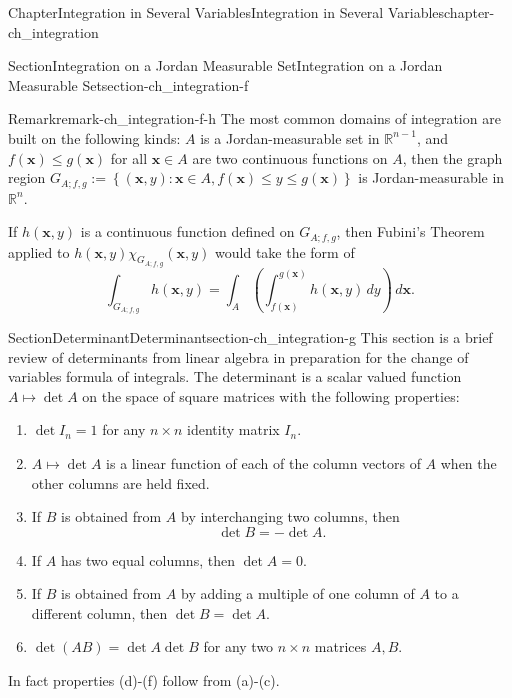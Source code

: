 \documentclass[oneside,10pt,]{book}
\numberwithin{equation}{section}
\newcommand{\bx}{\mathbf{x}}
\begin{document}
\begin{chapterptx}{Chapter}{Integration in Several Variables}{}{Integration in Several Variables}{}{}{chapter-ch_integration}
\begin{sectionptx}{Section}{Integration on a Jordan Measurable Set}{}{Integration on a Jordan Measurable Set}{}{}{section-ch_integration-f}
\begin{remark}{Remark}{}{remark-ch_integration-f-h}
The most common domains of integration are built on the following kinds: \(A\) is a Jordan-measurable set in \(\mathbb R^{n-1}\), and \(f(\bx)\le g(\bx)\) for all \(\bx\in A\) are two continuous functions on \(A\), then the graph region \(G_{A; f, g} :=\left\{ (\bx, y): \bx\in A, f(\bx)\le y \le g(\bx)\right\}\) is Jordan-measurable in \(\mathbb R^{n}\).%
\par
If \(h(\bx, y)\) is a continuous function defined on \(G_{A; f, g}\), then Fubini's Theorem applied to \(h(\bx, y)\chi_{G_{A; f, g}}(\bx, y)\) would take the form of%
\begin{equation*}
\int_{G_{A; f, g}} h(\bx, y) = \int_{A} \left(\int_{f(\bx)}^{g(\bx)} h(\bx, y)\, dy \right) \, d\bx\text{.}
\end{equation*}
%
\end{remark}
\end{sectionptx}
%
%
\typeout{************************************************}
\typeout{************************************************}
%
\begin{sectionptx}{Section}{Determinant}{}{Determinant}{}{}{section-ch_integration-g}
This section is a brief review of determinants from linear algebra in preparation for the change of variables formula of integrals. The determinant is a scalar valued function \(A\mapsto \det A\) on the space of square matrices with the following properties:%
\begin{enumerate}[label=(\alph*)]
\item{}\(\det I_n=1\) for any \(n\times n\) identity matrix \(I_n\).%
\item{}\(A\mapsto \det A\) is a linear function of each of the column vectors of \(A\) when the other columns are held fixed.%
\item{}If \(B\) is obtained from \(A\) by interchanging two columns, then%
\begin{equation*}
\det B=-\det A\text{.}
\end{equation*}
%
\item{}If \(A\) has two equal columns, then \(\det A=0\).%
\item{}If \(B\) is obtained from \(A\) by adding a multiple of one column of \(A\) to a different column, then \(\det B=\det A\).%
\item{}\(\det (AB)=\det A \det B\) for any two \(n\times n\) matrices \(A, B\).%
\end{enumerate}
In fact properties (d)-(f) follow from (a)-(c).%
\par

\end{sectionptx}
\end{chapterptx}
\end{document}
